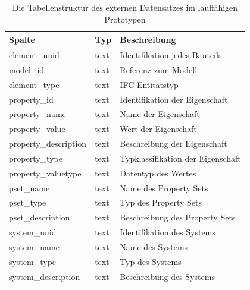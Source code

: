\begin{table}[!htb]
    \centering
    \caption[Tabellenstruktur von externem Datensatz]{Die Tabellenstruktur des externen Datensatzes im lauffähigen Prototypen}
    \label{tab:104_app-data-structure}
    \begin{tabular}{C{3cm} C{1.5cm} L{6.5cm}}
        \hline
        \textbf{Spalte} & \textbf{Typ} & \textbf{Beschreibung} \\
        \hline

        element\_uuid & text & Identifikation jedes Bauteils \\

        model\_id & text & Referenz zum Modell \\

        element\_type & text & IFC-Entitätstyp \\

        property\_id & text & Identifikation der Eigenschaft \\

        property\_name & text & Name der Eigenschaft \\

        property\_value & text & Wert der Eigenschaft \\

        property\_description & text & Beschreibung der Eigenschaft \\

        property\_type & text & Typklassifikation der Eigenschaft \\

        property\_valuetype & text & Datentyp des Wertes \\

        pset\_name & text & Name des Property Sets  \\

        pset\_type & text & Typ des Property Sets \\

        pset\_description & text & Beschreibung des Property Sets \\

        system\_uuid & text & Identifikation des Systems \\

        system\_name & text & Name des Systems \\

        system\_type & text & Typ des Systems \\

        system\_description & text & Beschreibung des Systems \\


\end{tabular}
\end{table}

